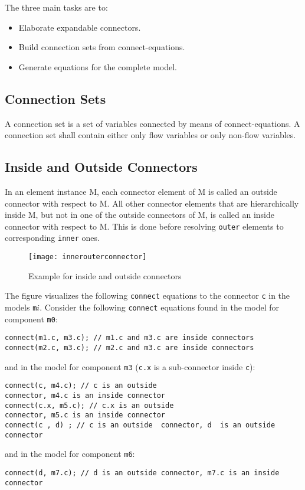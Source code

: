The three main tasks are to:
\begin{itemize}
\item
  Elaborate expandable connectors.
\item
  Build connection sets from connect-equations.
\item
  Generate equations for the complete model.
\end{itemize}

\subsection{Connection Sets}

A connection set is a set of variables connected by means of
connect-equations. A connection set shall contain either only flow
variables or only non-flow variables.

\subsection{Inside and Outside Connectors}

In an element instance M, each connector element of M is called an
outside connector with respect to M. All other connector elements that
are hierarchically inside M, but not in one of the outside connectors of
M, is called an inside connector with respect to M. This is done before
resolving \lstinline!outer! elements to corresponding \lstinline!inner! ones.

\begin{example}
\begin{figure}[H]
\texttt{[image: innerouterconnector]}
\caption{Example for inside and outside connectors}
\end{figure}
The figure visualizes the following \lstinline!connect! equations to
the connector \lstinline!c! in the models \lstinline!m!$i$. Consider the
following \lstinline!connect! equations found in the model for component \lstinline!m0!:
\begin{lstlisting}[language=modelica]
connect(m1.c, m3.c); // m1.c and m3.c are inside connectors
connect(m2.c, m3.c); // m2.c and m3.c are inside connectors
\end{lstlisting}
and in the model for component \lstinline!m3! (\lstinline!c.x! is a sub-connector inside
\lstinline!c!):
\begin{lstlisting}[language=modelica]
connect(c, m4.c); // c is an outside
connector, m4.c is an inside connector
connect(c.x, m5.c); // c.x is an outside
connector, m5.c is an inside connector
connect(c , d) ; // c is an outside  connector, d  is an outside connector
\end{lstlisting}
and in the model for component \lstinline!m6!:
\begin{lstlisting}[language=modelica]
connect(d, m7.c); // d is an outside connector, m7.c is an inside connector
\end{lstlisting}
\end{example}

